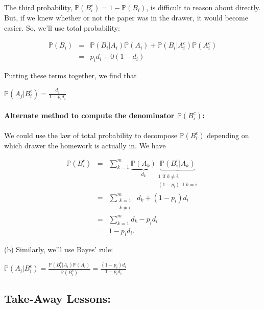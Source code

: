 \documentclass[6008notes.tex]{subfiles}
\begin{document}
The third probability, $\mathbb {P}(B_ i^ c) = 1-\mathbb {P}(B_ i)$, is difficult to reason about directly. But, if we knew whether or not the paper was in the drawer, it would become easier. So, we'll use total probability:

\begin{eqnarray*}
            \mathbb{P}(B_i) &=& \mathbb{P}(B_i|A_i)\mathbb{P}(A_i) + \mathbb{P}(B_i|A_i^c)\mathbb{P}(A_i^c) \\
            &=& p_i d_i + 0 (1-d_i)
\end{eqnarray*}

Putting these terms together, we find that

{\centering$\mathbb {P}(A_ j|B_ i^ c) = \frac{d_ j}{1-p_ i d_ i}$ \par}
 
\paragraph{Alternate method to compute the denominator $\mathbb {P}(B_ i^ c)$:} We could use the law of total probability to decompose $\mathbb {P}(B_ i^ c)$ depending on which drawer the homework is actually in. We have

\begin{eqnarray*}
        \mathbb{P}(B_i^c) &=& \sum_{k=1}^m
                       \underbrace{\mathbb{P}(A_k)}_{d_k}
                       \underbrace{\mathbb{P}(B_i^c|A_k)}_{\substack{1\text{ if }k\ne i,\\
                                                             (1-p_i)\text{ if }k=i}} \\
                  &=& \sum_{\substack{k=1,\\
                                     k\ne i}}^m d_k
                     + (1-p_i)d_i \\
                  &=& \sum_{k=1}^m d_k - p_i d_i \\
                  &=& 1 - p_i d_i.
\end{eqnarray*}

(b) Similarly, we'll use Bayes' rule:

{\centering$\mathbb {P}(A_ i | B_ i^ c) = \frac{\mathbb {P}(B_ i^ c | A_ i) \mathbb {P}(A_ i)}{\mathbb {P}(B_ i^ c)} = \frac{(1-p_ i) d_ i}{1 - p_ i d_ i}$ \par}
 
\subsection{Take-Away Lessons:}
\end{document}
